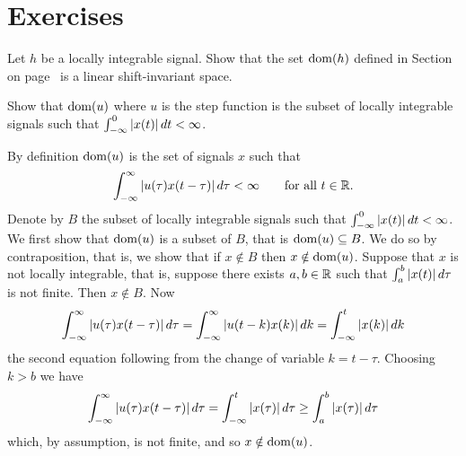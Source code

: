 \section*{Exercises}

\begin{excersizelist}


\item \label{exer:finhlinshiftinv}  Let $h$ be a locally integrable signal.  Show that the set $\operatorname{dom}(h)$ defined in Section~ on page~ is a linear shift-invariant space.

\item Show that $\operatorname{dom}(u)$ where $u$ is the step function is the subset of locally integrable signals such that $\int_{-\infty}^0\left\vert x(t) \right\vert dt < \infty$.
\begin{solution}
By definition $\operatorname{dom}(u)$ is the set of signals $x$ such that
\[
\int_{-\infty}^{\infty} \left\vert u(\tau) x(t - \tau) \right\vert d\tau < \infty \qquad \text{for all $t \in {\mathbb R}$}.
\]
Denote by $B$ the subset of locally integrable signals such that $\int_{-\infty}^0\left\vert x(t) \right\vert dt < \infty$.  We first show that $\operatorname{dom}(u)$ is a subset of $B$, that is $\operatorname{dom}(u) \subseteq B$.  We do so by contraposition, that is, we show that if $x \notin B$ then $x \notin \operatorname{dom}(u)$.  Suppose that $x$ is not locally integrable, that is, suppose there exists $a, b \in {\mathbb R}$ such that $\int_{a}^{b} \left\vert x(t) \right\vert d\tau$ is not finite.  Then $x \notin B$.  Now
\[
\int_{-\infty}^{\infty} \left\vert u(\tau) x(t - \tau) \right\vert d\tau = \int_{-\infty}^{\infty} \left\vert u(t - k) x(k) \right\vert dk = \int_{-\infty}^{t} \left\vert x(k) \right\vert dk
\]
the second equation following from the change of variable $k = t - \tau$.  Choosing $k > b$ we have
\[
\int_{-\infty}^{\infty} \left\vert u(\tau) x(t - \tau) \right\vert d\tau = \int_{-\infty}^{t} \left\vert x(\tau) \right\vert d\tau \geq \int_{a}^{b} \left\vert x(\tau) \right\vert d\tau
\]
which, by assumption, is not finite, and so $x \notin \operatorname{dom}(u)$.  


\end{solution}
\end{excersizelist}
